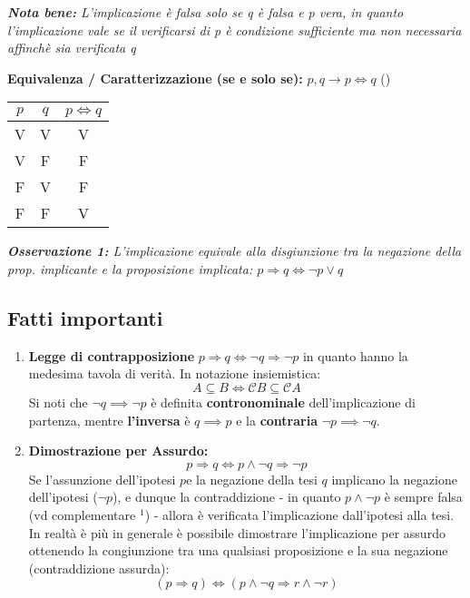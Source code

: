 \documentclass[10pt, oneside]{book}
\theoremstyle{plain}
\begin{document}
\begin{description}
\begin{center}
\begin{tabular}{c|c|c}
         \end{tabular}  \end{center}
    \item \textit{\textbf{Nota bene:} L'implicazione è falsa solo se q è falsa e p vera, in quanto l'implicazione vale se il verificarsi di p è condizione sufficiente ma non necessaria affinchè sia verificata q}
 \item[$\ast$] \textbf{Equivalenza / Caratterizzazione (se e solo se):} $p, q \longrightarrow p \Leftrightarrow q$ (\*)
   \item \begin{center} \begin{tabular}{c|c|c}
        $p$ & $q$ & $p \Leftrightarrow q$  \\
        \hline  V  & V & V \\ V & F & F \\ F & V & F \\ F & F & V 
       \end{tabular}  \end{center}
    \item \textit{\textbf{Osservazione 1:} L'implicazione equivale alla disgiunzione tra la negazione della prop. implicante e la proposizione implicata: $p \Rightarrow q \Longleftrightarrow \neg p \lor q$}
\end{description}
\subsection*{Fatti importanti}
\begin{enumerate}
    \item \textbf{Legge di contrapposizione} $p \Rightarrow q \Longleftrightarrow \neg q \Rightarrow \neg p$ in quanto hanno la medesima tavola di verità\*. In notazione insiemistica: \[A \subseteq B \Longleftrightarrow \mathcal{C}B \subseteq \mathcal{C}A\]
    Si noti che $\neg q \implies \neg p$ è definita \textbf{contronominale} dell'implicazione di partenza, mentre \textbf{l'inversa} è $q \implies p$ e la \textbf{contraria} $\neg p \implies \neg q$.
    \item \textbf{Dimostrazione per Assurdo:} \[p \Rightarrow q \Longleftrightarrow p \land \neg q \Rightarrow \neg p\] Se l'assunzione dell'ipotesi $p $e la negazione della tesi $q$ implicano la negazione dell'ipotesi ($\neg p$), e dunque la contraddizione - in quanto $p \land \neg p$ è sempre falsa (vd complementare \hyperlink{nullo}{$^1$}) - allora è verificata l'implicazione dall'ipotesi alla tesi. In realtà è più in generale è possibile dimostrare l'implicazione per assurdo ottenendo la congiunzione tra una qualsiasi proposizione e la sua negazione (contraddizione assurda): \[(p \Rightarrow q) \Longleftrightarrow (p \land \neg q \Rightarrow r \land \neg r)\]
\end{enumerate}
\end{document}
